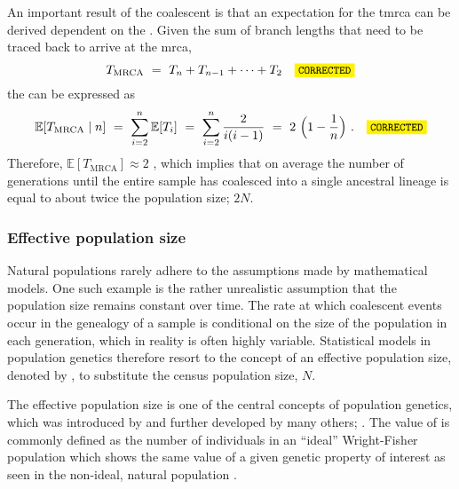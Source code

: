 An important result of the coalescent is that an expectation for the \gls{tmrca} can be derived dependent on the .
Given the sum of branch lengths that need to be traced back to arrive at the \gls{mrca},
\begin{equation*}
	T_\text{MRCA} ~=~ T_n + T_{n-1} + \dots + T_2 \CorrectLabel
\end{equation*}
the  can be expressed as
\begin{equation}\label{eq:coal_tmrca}
	\mathbb{E}[T_\text{MRCA} \mid n]
	~=~ \sum_{i = 2}^{n} \mathbb{E}[T_i]
	~=~ \sum_{i = 2}^{n} \frac{2}{i(i-1)}
	~=~ 2~\Big( 1 - \frac{1}{n} \Big)
	\ \text{.} \CorrectLabel
\end{equation}
Therefore,  ${\mathbb{E}[T_\text{MRCA}] \approx 2}$ , which implies that on average the number of generations until the entire sample has coalesced into a single ancestral lineage is equal to about twice the population size; \ie $2N$.


%
\subsubsection{Effective population size}
%


Natural populations rarely adhere to the assumptions made by mathematical models.
One such example is the rather unrealistic assumption that the population size remains constant over time.
The rate at which coalescent events occur in the genealogy of a sample is conditional on the size of the population in each generation, which in reality is often highly variable.
Statistical models in population genetics therefore resort to the concept of an effective population size, denoted by \Ne, to substitute the census population size, $N$.

The effective population size is one of the central concepts of population genetics, which was introduced by \citet{Wright:1931ub} and further developed by many others; \eg \citet{crow1970introduction}.
The value of \Ne is commonly defined as the number of individuals in an ``ideal'' Wright-Fisher population \citep{fisher1930genetical,Wright:1931ub} which shows the same value of a given genetic property of interest as seen in the non-ideal, natural population \citep{ewens2012mathematical}.

